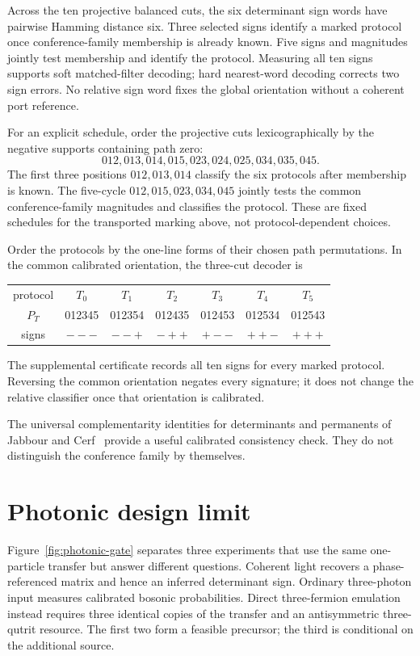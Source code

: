 \documentclass[11pt]{article}
\theoremstyle{remark}
\begin{document}
Across the ten projective balanced cuts, the six determinant sign words have
pairwise Hamming distance six.  Three selected signs identify a marked
protocol once conference-family membership is already known.  Five signs and magnitudes
jointly test membership and identify the protocol.  Measuring all ten signs
supports soft matched-filter decoding; hard nearest-word decoding corrects
two sign errors.  No relative sign word fixes the global orientation without
a coherent port reference.

For an explicit schedule, order the projective cuts lexicographically by the
negative supports containing path zero:
\[
012,013,014,015,023,024,025,034,035,045.
\]
The first three positions \(012,013,014\) classify the six protocols after
membership is known.  The five-cycle
\(012,015,023,034,045\) jointly tests the common conference-family magnitudes and
classifies the protocol.  These are fixed schedules for the transported
marking above, not protocol-dependent choices.

Order the protocols by the one-line forms of their chosen path permutations.
In the common calibrated orientation, the three-cut decoder is
\begin{center}
\small
\begin{tabular}{c@{\quad}cccccc}
\toprule
protocol & \(T_0\)&\(T_1\)&\(T_2\)&\(T_3\)&\(T_4\)&\(T_5\)\\
\(P_T\) &012345&012354&012435&012453&012534&012543\\
signs &\(-{-}-\)&\(-{-}+\)&\(-{+}+\)&\(+{-}-\)&\(+{+}-\)&\(+{+}+\)\\
\bottomrule
\end{tabular}
\end{center}
The supplemental certificate records all ten signs for every marked protocol.
Reversing the common orientation negates every signature; it does not change
the relative classifier once that orientation is calibrated.

The universal complementarity identities for determinants and permanents of
Jabbour and Cerf~\cite{JabbourCerf} provide a useful calibrated consistency
check.  They do not distinguish the conference family by themselves.

\section{Photonic design limit}

Figure~\ref{fig:photonic-gate} separates three experiments that use the same
one-particle transfer but answer different questions.  Coherent light recovers
a phase-referenced matrix and hence an inferred determinant sign.  Ordinary
three-photon input measures calibrated bosonic probabilities.  Direct
three-fermion emulation instead requires three identical copies of the
transfer and an antisymmetric three-qutrit resource.  The first two form a
feasible precursor; the third is conditional on the additional source.
\end{document}
